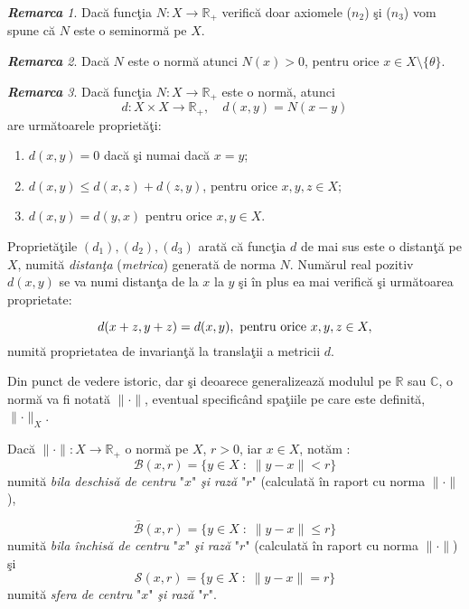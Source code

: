 \documentclass[ a4paper, 12pt]{report}
\theoremstyle{definition}
\theoremstyle{remark}
\newtheorem{remarc}{\bf Remarca}[section]
\numberwithin{equation}{section}
\begin{document}
\begin{remarc}
Dac\u a func\c tia $N : X \rightarrow \mathbb{R}_{+}$ verific\u a doar axiomele ($n_2$) \c si ($n_3$) vom spune c\u a $N$ este o seminorm\u a pe $X$.
\end{remarc}
\begin{remarc}
Dac\u a $N$ este o norm\u a atunci $N(x) > 0$, pentru orice $x \in X\setminus \{\theta\}$.
\end{remarc}
\begin{remarc}
Dac\u a func\c tia $N : X \rightarrow \mathbb{R}_{+}$ este  o norm\u a, atunci
$$d : X \times X \rightarrow \mathbb{R}_{+}, \quad
d(x,y) = N(x - y) $$ are urm\u atoarele propriet\u a\c ti:
\begin{enumerate}[($d_1$)]
\item $d(x,y) = 0$ dac\u a \c si numai dac\u a $x =y $;
\item $d(x,y) \leq d(x,z) + d(z,y)$, pentru orice $x,y,z \in X$;
\item $d(x,y) = d(y,x)$ pentru orice $x, y \in X$.
\end{enumerate}
Propriet\u a\c tile $(d_1),(d_2),(d_3)$ arat\u a c\u a func\c tia $d$ de mai sus este o distan\c t\u a pe $X$, numit\u a {\it distan\c ta} ({\it metrica}) generat\u a de norma $N$. Num\u arul real pozitiv
$d(x,y)$ se va numi distan\c ta de la $x$ la $y$ \c si \^in plus ea mai verific\u a \c si  urm\u atoarea proprietate:

$$d(x+z,y+z) = d(x,y), \hbox{ pentru orice } x,y,z \in X,$$ numit\u a proprietatea de invarian\c t\u a la transla\c tii a metricii $d$.
\end{remarc}

Din punct de vedere istoric, dar \c si deoarece  generalizeaz\u a modulul pe $\mathbb{R}$ sau $\mathbb{C}$, o norm\u a va fi notat\u a  $\lVert \cdot \rVert$, eventual specific\^and spa\c tiile pe care
este definit\u a, $\lVert \cdot \rVert_{X}$.

\smallskip

Dac\u a $\lVert \cdot \rVert : X \rightarrow \mathbb{R}_{+}$ o norm\u a pe $X$, $r>0$, iar $x \in X$, not\u am :
$$\mathcal{B}(x,r) = \{ y \in X \; : \; \lVert y-x \rVert < r\}$$
numit\u a {\it bila deschis\u a de centru} "$x$" \emph{\c si raz\u a} "$r$" (calculat\u a \^in raport cu norma $\lVert \cdot \rVert$),

$$\mathcal{\bar{B}}(x,r) = \{y \in X \; : \;  \lVert y-x \rVert \leq r\}$$
numit\u a\emph{ bila \^inchis\u a de centru} "$x$" \emph{\c si raz\u a} "$r$" (calculat\u a \^in raport cu norma $\lVert \cdot \rVert$) \c si
$$\mathcal{S}(x,r) = \{y \in X \; : \; \lVert y-x \rVert = r\}$$ numit\u a \emph{sfera de centru} "$x$" \emph{\c si raz\u a} "$r$".
\end{document}
